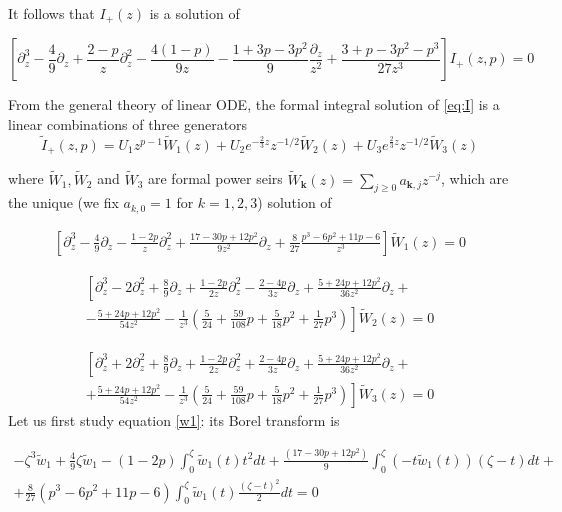 \documentclass{article}
\begin{document}
It follows that $I_+(z)$ is a solution of
 
\begin{equation}\label{eq:I}
\left[\partial_z^3-\frac{4}{9}\partial_z+\frac{2-p}{z}\partial_z^2-\frac{4(1-p)}{9z}-\frac{1+3p-3p^2}{9}\frac{\partial_z}{z^2}+\frac{3+p-3p^2-p^3}{27z^3}\right]I_+(z,p)=0
\end{equation}

From the general theory of linear ODE, the formal integral solution of \eqref{eq:I} is a linear combinations of three generators 
\begin{equation}
\tilde{I}_+(z,p)=U_1z^{p-1}\tilde{W}_1(z)+U_2e^{-\tfrac{2}{3}z}z^{-1/2}\tilde{W}_2(z)+U_3e^{\tfrac{2}{3}z}z^{-1/2}\tilde{W}_3(z)
\end{equation}

where $\tilde{W}_1, \tilde{W}_2$ and $\tilde{W}_3$ are formal power seirs $\tilde{W}_{\mathbf{k}}(z)=\sum_{j\geq 0}a_{\mathbf{k},j}z^{-j}$, which are the unique (we fix $a_{k,0}=1$ for $k=1,2,3$) solution of 

\begin{multline}\label{w1}
\left[\partial_z^3-\frac{4}{9}\partial_z-\frac{1-2p}{z}\partial_z^2+\frac{17-30p+12p^2}{9z^2}\partial_z+\frac{8}{27}\frac{p^3-6p^2+11p-6}{z^3}\right]\tilde{W}_1(z)=0
\end{multline}


\begin{multline}\label{w2}
\left[\partial_z^3-2\partial_z^2+\frac{8}{9}\partial_z+\frac{1-2p}{2z}\partial_z^2-\frac{2-4p}{3z}\partial_z+\frac{5+24p+12p^2}{36z^2}\partial_z+\right.\\
\left.-\frac{5+24p+12p^2}{54z^2}-\frac{1}{z^3}\left(\frac{5}{24}+\frac{59}{108}p+\frac{5}{18}p^2+\frac{1}{27}p^3\right)\right]\tilde{W}_2(z)=0
\end{multline}

\begin{multline}\label{w3}
\left[\partial_z^3+2\partial_z^2+\frac{8}{9}\partial_z+\frac{1-2p}{2z}\partial_z^2+\frac{2-4p}{3z}\partial_z+\frac{5+24p+12p^2}{36z^2}\partial_z+\right.\\
\left.+\frac{5+24p+12p^2}{54z^2}-\frac{1}{z^3}\left(\frac{5}{24}+\frac{59}{108}p+\frac{5}{18}p^2+\frac{1}{27}p^3\right)\right]\tilde{W}_3(z)=0
\end{multline}
Let us first study equation \eqref{w1}: its Borel transform is

\begin{multline*}
-\zeta^3\tilde{w}_1+\frac{4}{9}\zeta\tilde{w}_1-(1-2p)\int_0^\zeta\tilde{w}_1(t)t^2dt+\frac{(17-30p+12p^2)}{9}\int_0^\zeta(-t\tilde{w}_1(t))(\zeta-t)dt+\\
+\frac{8}{27}(p^3-6p^2+11p-6)\int_0^\zeta\tilde{w}_1(t)\frac{(\zeta-t)^2}{2}dt=0
\end{multline*}
\end{document}
